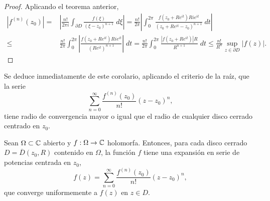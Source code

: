 \begin{proof}
Aplicando el teorema anterior,
\[
\begin{split}
	\left|f^{\left(n\right)}\left(z_{0}\right)\right| = & \left|\frac{n!}{2\pi i}\int _{\partial D}\frac{f\left(\xi\right)}{\left(\xi-z_{0}\right)^{n+1}} \; d\xi\right|=\frac{n!}{2\pi } \left|\int^{2\pi }_{0} \frac{f\left(z_{0}+Re^{it}\right)Rie^{it}}{\left(z_{0}+Re^{it}-z_{0}\right)^{n+1}} \; dt\right| \\
	\leq & \frac{n!}{2\pi }\int^{2\pi }_{0}  \left|\frac{f\left(z_{0} + Re^{it}\right)Rie^{it}}{\left(Re^{it}\right)^{n+1}}\right| \; dt = \frac{n!}{2\pi }\int^{2\pi }_{0} \frac{ \left|f\left(z_{0} + Re^{it}\right)\right|R}{R^{n+1}} \; dt 
	\leq \frac{n!}{R^{n}}\sup_{z \in \partial D} \left|f\left(z\right)\right|.
\end{split}
\]
\end{proof}
\begin{observation}
Se deduce inmediatamente de este corolario, aplicando el criterio de la raíz, que la serie
\[\sum^{\infty}_{n = 0}\frac{f^{\left(n\right)}\left(z_{0}\right)}{n!}\left(z-z_{0}\right)^{n} ,\]
tiene radio de convergencia mayor o igual que el radio de cualquier disco cerrado centrado en $\displaystyle z_{0} $. 
\end{observation}
\begin{theorem}
Sean $\displaystyle \Omega \subset \mathbb{C} $ abierto y $\displaystyle f : \Omega \to \mathbb{C} $ holomorfa. Entonces, para cada disco cerrado $\displaystyle D = \overline{D}\left(z_{0}, R\right) $ contenido en $\displaystyle \Omega  $, la función $\displaystyle f $ tiene una expansión en serie de potencias centrada en $\displaystyle z_{0} $,
\[f\left(z\right)=\sum^{\infty}_{n = 0}\frac{f^{\left(n\right)}\left(z_{0}\right)}{n!}\left(z-z_{0}\right)^{n} ,\]
que converge uniformemente a $\displaystyle f\left(z\right) $ en $\displaystyle z \in D $. 
\end{theorem}
